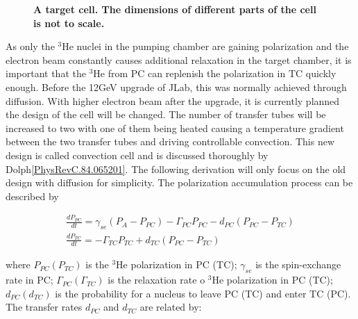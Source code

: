 \begin{figure}[H]
	\centering
	\caption{{\bf A target cell. The dimensions of different parts of the cell is not to scale.}}
	\label{TargetCell}
\end{figure}

As only the $^{3}$He nuclei in the pumping chamber are gaining polarization and the electron beam constantly causes additional relaxation in the target chamber, it is important that the $^{3}$He from PC can replenish the polarization in TC quickly enough. Before the 12GeV upgrade of JLab, this was normally achieved through diffusion. With higher electron beam after the upgrade, it is currently planned the design of the cell will be changed. The number of transfer tubes will be increased to two with one of them being heated causing a temperature gradient between the two transfer tubes and driving controllable convection. This new design is called convection cell and is discussed thoroughly by Dolph\ref{PhysRevC.84.065201}. The following derivation will only focus on the old design with diffusion for simplicity. The polarization accumulation process can be described by 

\begin{subequations}\label{DoubleChamber}
	\begin{gather}
	\frac{dP_{PC}}{dt}=\gamma_{se}(P_{A}-P_{PC})-\Gamma_{PC}P_{PC}-d_{PC}(P_{PC}-P_{TC})\\
	\frac{dP_{TC}}{dt}=-\Gamma_{TC}P_{TC}+d_{TC}(P_{PC}-P_{TC})
	\end{gather}
\end{subequations}

where $P_{PC} (P_{TC})$ is the $^{3}$He polarization in PC (TC); $\gamma_{se}$ is the spin-exchange rate in PC; $\Gamma_{PC} (\Gamma_{TC})$  is the relaxation rate o $^{3}$He polarization in PC (TC); $d_{PC} (d_{TC})$ is the probability for a nucleus to leave PC (TC) and enter TC (PC). The transfer rates $d_{PC}$ and $d_{TC}$ are related by:

